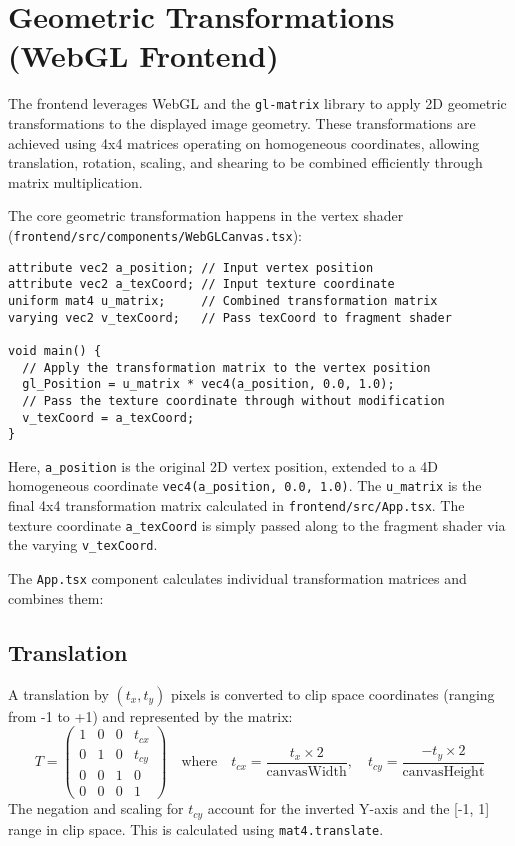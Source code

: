 \documentclass{article}
\begin{document}
\section{Geometric Transformations (WebGL Frontend)}

The frontend leverages WebGL and the \texttt{gl-matrix} library to apply 2D geometric transformations to the displayed image geometry. These transformations are achieved using 4x4 matrices operating on homogeneous coordinates, allowing translation, rotation, scaling, and shearing to be combined efficiently through matrix multiplication.

The core geometric transformation happens in the vertex shader (\texttt{frontend/src/components/WebGLCanvas.tsx}):
\begin{verbatim}
attribute vec2 a_position; // Input vertex position
attribute vec2 a_texCoord; // Input texture coordinate
uniform mat4 u_matrix;     // Combined transformation matrix
varying vec2 v_texCoord;   // Pass texCoord to fragment shader

void main() {
  // Apply the transformation matrix to the vertex position
  gl_Position = u_matrix * vec4(a_position, 0.0, 1.0);
  // Pass the texture coordinate through without modification
  v_texCoord = a_texCoord;
}
\end{verbatim}
Here, \texttt{a\_position} is the original 2D vertex position, extended to a 4D homogeneous coordinate \texttt{vec4(a\_position, 0.0, 1.0)}. The \texttt{u\_matrix} is the final 4x4 transformation matrix calculated in \texttt{frontend/src/App.tsx}. The texture coordinate \texttt{a\_texCoord} is simply passed along to the fragment shader via the varying \texttt{v\_texCoord}.

The \texttt{App.tsx} component calculates individual transformation matrices and combines them:

\subsection{Translation}
A translation by $(t_x, t_y)$ pixels is converted to clip space coordinates (ranging from -1 to +1) and represented by the matrix:
\[
T =
\begin{pmatrix}
1 & 0 & 0 & t_{cx} \\
0 & 1 & 0 & t_{cy} \\
0 & 0 & 1 & 0 \\
0 & 0 & 0 & 1
\end{pmatrix}
\quad \text{where} \quad
t_{cx} = \frac{t_x \times 2}{\text{canvasWidth}}, \quad
t_{cy} = \frac{-t_y \times 2}{\text{canvasHeight}}
\]
The negation and scaling for $t_{cy}$ account for the inverted Y-axis and the [-1, 1] range in clip space. This is calculated using \texttt{mat4.translate}.
\end{document}
